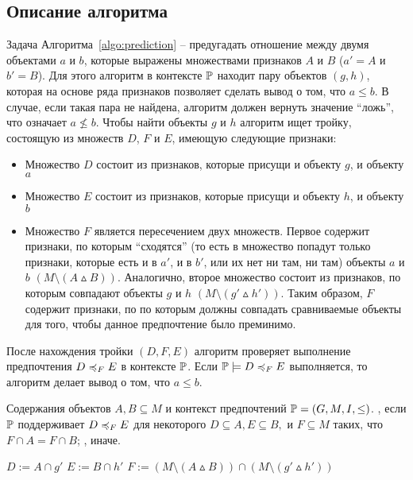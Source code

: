 	\subsection{Описание алгоритма}
	\label{subsec:cp_description}
		Задача Алгоритма~\ref{algo:prediction} – предугадать отношение между двумя объектами $a$ и $b$, которые выражены множествами признаков $A$ и $B$ ($a' = A$ и $b' = B$). Для этого алгоритм в контексте $\mathbb{P}$ находит пару объектов $(g, h)$, которая на основе ряда признаков позволяет сделать вывод о том, что $a \leq b$. В случае, если такая пара не найдена, алгоритм должен вернуть значение ``ложь'', что означает $a \nleq b$. Чтобы найти объекты $g$ и $h$ алгоритм ищет тройку, состоящую из множеств $D$, $F$ и $E$, имеющую следующие признаки:
		\begin{itemize}
			\item Множество $D$ состоит из признаков, которые присущи и объекту $g$, и объекту $a$
			\item Множество $E$ состоит из признаков, которые присущи и объекту $h$, и объекту $b$
			\item Множество $F$ является пересечением двух множеств. Первое содержит признаки, по которым ``сходятся'' (то есть в множество попадут только признаки, которые есть и в $a'$, и в $b'$, или их нет ни там, ни там) объекты $a$ и $b$ $(M \setminus (A \vartriangle B))$. Аналогично, второе множество состоит из признаков, по которым совпадают объекты $g$ и $h$ $(M \setminus (g' \vartriangle h'))$. Таким образом, $F$ содержит признаки, по по которым должны совпадать сравниваемые объекты для того, чтобы данное предпочтение было преминимо.
		\end{itemize}
		После нахождения тройки $(D,F,E)$ алгоритм проверяет выполнение предпочтения $D \preccurlyeq_{F} E$ в контексте $\mathbb{P}$. Если $\PP \models \DEF$ выполняется, то алгоритм делает вывод о том, что $a \leq b$.
	
		\begin{algorithm}
			\caption{$(A, B, \PP)$ \cite[Алг.~1]{Obiedkov:2013}}
			\label{algo:prediction}
			\begin{algorithmic}[1]
				\REQUIRE Содержания объектов $A, B \subseteq M$ и контекст предпочтений $\mathbb{P} = (G, M, I, \leq)$.
				\ENSURE \TRUE, если $\mathbb{P}$ поддерживает $D \preccurlyeq_{F} E$ для некоторого $D \subseteq A, E \subseteq B,$ и $F \subseteq M$ таких, что $F \cap A = F \cap B$; \FALSE, иначе.
				\item[]
				\STATE $D := A \cap g'$
				\STATE $E := B \cap h'$
				\STATE $F := (M \setminus (A \vartriangle B)) \cap (M \setminus (g' \vartriangle h'))$
				\IF{$\PP \models \DEF$}
				\RETURN \TRUE
				\ENDIF
				\ENDFOR
				\ENDFOR
				\RETURN \FALSE
			\end{algorithmic}
		\end{algorithm}
		
